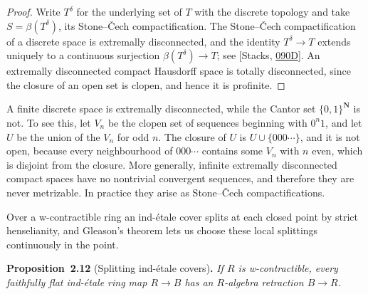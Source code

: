 \documentclass[11pt]{article}
\newenvironment{bpstatement}[2]{\par\addvspace{0.6\baselineskip}\noindent\textbf{#1}#2\textbf{.}\enspace\ignorespaces}
  {\par\addvspace{0.4\baselineskip}}
\newenvironment{bpstatementit}[2]{\begin{bpstatement}{#1}{#2}\itshape\ignorespaces}{\end{bpstatement}}
\begin{document}
\begin{proof}[{Proof}]\label{bp32}%
Write \(T^{\delta}\) for the underlying set of \(T\) with the discrete topology and take \(S=\beta(T^{\delta})\), its Stone–Čech compactification. The Stone–Čech compactification of a discrete space is extremally disconnected, and the identity \(T^{\delta}\to T\) extends uniquely to a continuous surjection \(\beta(T^{\delta})\to T\); see [Stacks, \href{https://stacks.math.columbia.edu/tag/090D}{090D}]. An extremally disconnected compact Hausdorff space is totally disconnected, since the closure of an open set is clopen, and hence it is profinite.
\end{proof}

\label{bp33}%
A finite discrete space is extremally disconnected, while the Cantor set \(\{0,1\}^{\mathbf N}\) is not. To see this, let \(V_n\) be the clopen set of sequences beginning with \(0^n1\), and let \(U\) be the union of the \(V_n\) for odd \(n\). The closure of \(U\) is \(U\cup\{000\cdots\}\), and it is not open, because every neighbourhood of \(000\cdots\) contains some \(V_n\) with \(n\) even, which is disjoint from the closure. More generally, infinite extremally disconnected compact spaces have no nontrivial convergent sequences, and therefore they are never metrizable. In practice they arise as Stone–Čech compactifications.

Over a w-contractible ring an ind-étale cover splits at each closed point by strict henselianity, and Gleason's theorem lets us choose these local splittings continuously in the point.

\label{bp34}%
\begin{bpstatementit}{Proposition~2.12}{ (Splitting ind-étale covers)}
If \(R\) is w-contractible, every faithfully flat ind-étale ring map \(R\to B\) has an \(R\)-algebra retraction \(B\to R\).
\end{bpstatementit}
\end{document}
